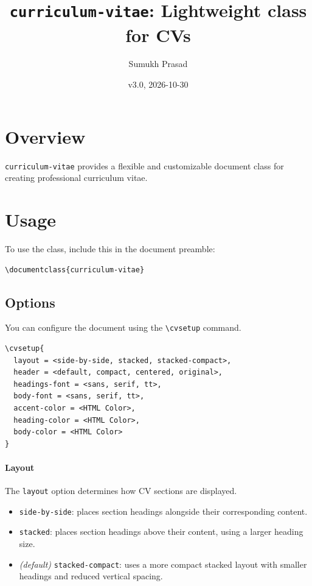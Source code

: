 \documentclass[10pt]{article}
\title{\texttt{curriculum-vitae}: Lightweight class for CVs}
\author{Sumukh Prasad}
\date{v3.0, 2026-10-30}
\begin{document}
\maketitle

\tableofcontents

\vspace{1cm}

\section{Overview}
\texttt{curriculum-vitae} provides a flexible and customizable
document class for creating professional curriculum vitae.

\section{Usage}

To use the class, include this in the document preamble:

\begin{verbatim}
\documentclass{curriculum-vitae}
\end{verbatim}

\subsection{Options}
You can configure the document using the \verb|\cvsetup| command.

\begin{verbatim}
\cvsetup{
  layout = <side-by-side, stacked, stacked-compact>,
  header = <default, compact, centered, original>,
  headings-font = <sans, serif, tt>,
  body-font = <sans, serif, tt>,
  accent-color = <HTML Color>,
  heading-color = <HTML Color>,
  body-color = <HTML Color>
}
\end{verbatim}


\paragraph{Layout}

The \verb|layout| option determines how CV sections are
displayed.

\begin{itemize}
    \item \verb|side-by-side|: places section headings
    alongside their corresponding content.

    \item \verb|stacked|: places section headings above
    their content, using a larger heading size.

    \item \textit{(default)} \verb|stacked-compact|: uses a more compact
    stacked layout with smaller headings and reduced
    vertical spacing.
\end{itemize}
\end{document}
